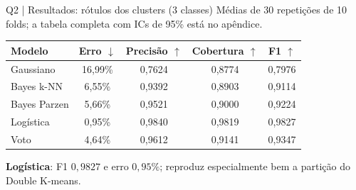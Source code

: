 \documentclass[aspectratio=169,11pt]{beamer}
\begin{document}
\begin{frame}[t]{Q2 | Resultados: rótulos dos clusters (3 classes)}
\small Médias de 30 repetições de 10 folds; a tabela completa com ICs de 95\% está no apêndice.\vspace{2mm}
\par
\small
\renewcommand{\arraystretch}{1.3}
\setlength{\tabcolsep}{4pt}
\centering
\begin{tabular}{lcccc}
\toprule
Modelo & Erro $\downarrow$ & Precisão $\uparrow$ & Cobertura $\uparrow$ & F1 $\uparrow$ \\
\midrule
Gaussiano & 16,99\% & 0,7624 & 0,8774 & 0,7976 \\
Bayes k-NN & 6,55\% & 0,9392 & 0,8903 & 0,9114 \\
Bayes Parzen & 5,66\% & 0,9521 & 0,9000 & 0,9224 \\
Logística & 0,95\% & 0,9840 & 0,9819 & 0,9827 \\
Voto & 4,64\% & 0,9612 & 0,9141 & 0,9347 \\
\bottomrule
\end{tabular}
\par\vspace{3mm}
\begin{notabox}\small \textbf{Logística}: F1 $0,9827$ e erro $0,95\%$; reproduz especialmente bem a partição do Double K-means.\end{notabox}
\end{frame}
\end{document}
